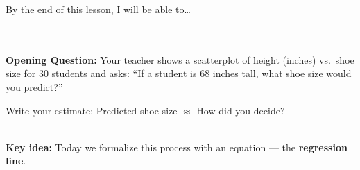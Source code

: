 \documentclass[10pt]{article}
\begin{document}
\namedateperiod

\vspace{0.12in}

\begin{objectivebox}
\small By the end of this lesson, I will be able to\dots\\[4pt]
\writeline\\[1pt]
\writeline\\[1pt]
\writeline
\end{objectivebox}

\vspace{0.1in}

\begin{vocabbox}
\end{vocabbox}

\vspace{0.1in}

\begin{hookbox}
\small\textbf{Opening Question:} Your teacher shows a scatterplot of height (inches) vs.\
shoe size for 30 students and asks: ``If a student is 68 inches tall, what shoe size would
you predict?''

\vspace{6pt}
Write your estimate: Predicted shoe size $\approx$ \blank{2.5cm} \quad How did you decide?\\[8pt]
\writeline\\[1pt]\writeline

\vspace{4pt}
\textbf{Key idea:} Today we formalize this process with an equation --- the \textbf{regression line}.
\end{hookbox}

\vspace{0.1in}
\end{document}
